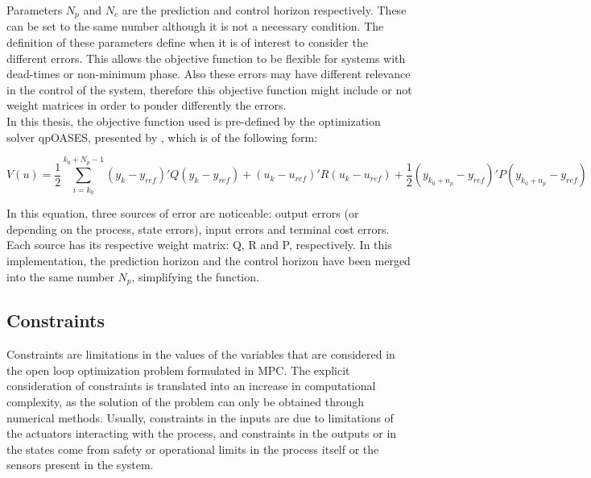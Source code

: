 Parameters $N_{p}$ and $N_{c}$ are the prediction and control horizon respectively. These can be set to the same number although it is not a necessary condition. The definition of these parameters define when it is of interest to consider the different errors. This allows the objective function to be flexible for systems with dead-times or non-minimum phase. Also these errors may have different relevance in the control of the system, therefore this objective function might include or not weight matrices in order to ponder differently the errors.\\

In this thesis, the objective function used is pre-defined by the optimization solver qpOASES, presented by \cite{Ferreau2006}, which is of the following form:

\begin{equation} \label{objectivefunction2}
V(u) = \frac{1}{2} \sum_{i=k_{0}}^{k_{0} + N_{p} - 1} (y_{k} - y_{ref})'Q(y_{k} - y_{ref}) + (u_{k} - u_{ref})'R(u_{k} - u_{ref}) + \frac{1}{2} (y_{k_{0} + n_{p}} - y_{ref})'P(y_{k_{0} + n_{p}} - y_{ref})
\end{equation}

In this equation, three sources of error are noticeable: output errors (or depending on the process, state errors), input errors and terminal cost errors. Each source has its respective weight matrix: Q, R and P, respectively. In this implementation, the prediction horizon and the control horizon have been merged into the same number $N_{p}$, simplifying the function.

\subsection{Constraints}%

Constraints are limitations in the values of the variables that are considered in the open loop optimization problem formulated in MPC. The explicit consideration of constraints is translated into an increase in computational complexity, as the solution of the problem can only be obtained through numerical methods. Usually, constraints in the inputs are due to limitations of the actuators interacting with the process, and constraints in the outputs or in the states come from safety or operational limits in the process itself or the sensors present in the system.\\

